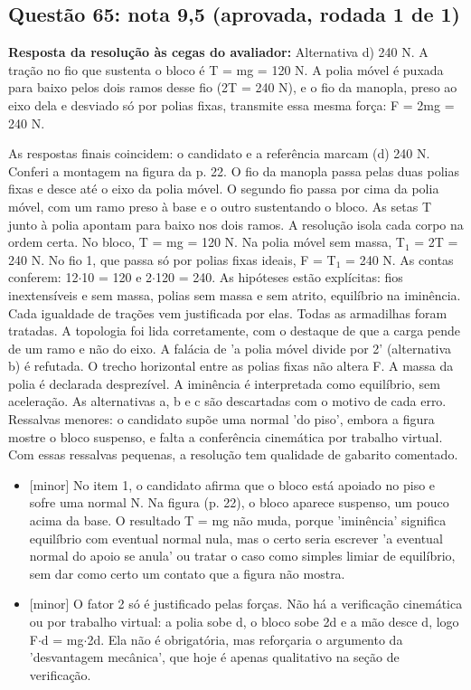 \documentclass{article}%
\begin{document}
\subsection*{Questão 65: nota 9,5 (aprovada, rodada 1 de 1)}%
\textbf{Resposta da resolução às cegas do avaliador:} Alternativa d) 240 N. A tração no fio que sustenta o bloco é T = mg = 120 N. A polia móvel é puxada para baixo pelos dois ramos desse fio (2T = 240 N), e o fio da manopla, preso ao eixo dela e desviado só por polias fixas, transmite essa mesma força: F = 2mg = 240 N.\par %
As respostas finais coincidem: o candidato e a referência marcam (d) 240 N. Conferi a montagem na figura da p. 22. O fio da manopla passa pelas duas polias fixas e desce até o eixo da polia móvel. O segundo fio passa por cima da polia móvel, com um ramo preso à base e o outro sustentando o bloco. As setas T junto à polia apontam para baixo nos dois ramos. A resolução isola cada corpo na ordem certa. No bloco, T = mg = 120 N. Na polia móvel sem massa, T$_{1}$ = 2T = 240 N. No fio 1, que passa só por polias fixas ideais, F = T$_{1}$ = 240 N. As contas conferem: 12$\cdot$10 = 120 e 2$\cdot$120 = 240. As hipóteses estão explícitas: fios inextensíveis e sem massa, polias sem massa e sem atrito, equilíbrio na iminência. Cada igualdade de trações vem justificada por elas. Todas as armadilhas foram tratadas. A topologia foi lida corretamente, com o destaque de que a carga pende de um ramo e não do eixo. A falácia de 'a polia móvel divide por 2' (alternativa b) é refutada. O trecho horizontal entre as polias fixas não altera F. A massa da polia é declarada desprezível. A iminência é interpretada como equilíbrio, sem aceleração. As alternativas a, b e c são descartadas com o motivo de cada erro. Ressalvas menores: o candidato supõe uma normal 'do piso', embora a figura mostre o bloco suspenso, e falta a conferência cinemática por trabalho virtual. Com essas ressalvas pequenas, a resolução tem qualidade de gabarito comentado.%
\begin{itemize}%
\item%
{[}minor{]} No item 1, o candidato afirma que o bloco está apoiado no piso e sofre uma normal N. Na figura (p. 22), o bloco aparece suspenso, um pouco acima da base. O resultado T = mg não muda, porque 'iminência' significa equilíbrio com eventual normal nula, mas o certo seria escrever 'a eventual normal do apoio se anula' ou tratar o caso como simples limiar de equilíbrio, sem dar como certo um contato que a figura não mostra.%
\item%
{[}minor{]} O fator 2 só é justificado pelas forças. Não há a verificação cinemática ou por trabalho virtual: a polia sobe d, o bloco sobe 2d e a mão desce d, logo F$\cdot$d = mg$\cdot$2d. Ela não é obrigatória, mas reforçaria o argumento da 'desvantagem mecânica', que hoje é apenas qualitativo na seção de verificação.%
\end{itemize}%
\end{document}

